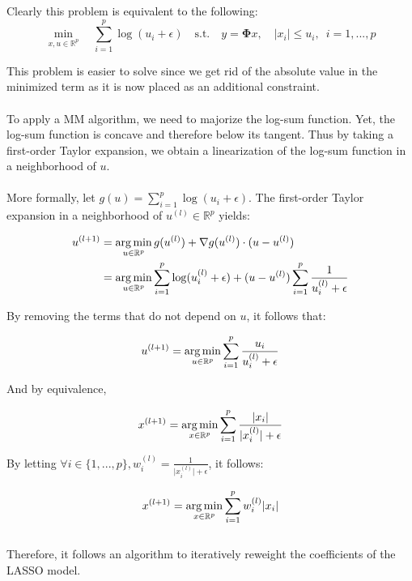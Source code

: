 \documentclass[a4paper,10pt]{article}
\theoremstyle{definition}
\begin{document}
Clearly this problem is equivalent to the following:
\begin{equation*}
    \min_{x,u \in \mathbb{R}^p} \quad  \sum_{i=1}^p \log(u_i + \epsilon) \quad \textrm{s.t.} \quad  y = \mathbf{\Phi} x, \quad \lvert x_i \rvert \leq u_i, \enspace i=1,...,p
\end{equation*}

This problem is easier to solve since we get rid of the absolute value in the minimized term as it is now placed as an additional constraint.
\\
\\
To apply a MM algorithm, we need to majorize the log-sum function. Yet, the log-sum function is concave and therefore below its tangent. Thus by taking a first-order Taylor expansion, we obtain a linearization of
the log-sum function in a neighborhood of $u$.
\\
\\
More formally, let $g(u) = \sum_{i=1}^p \log(u_i + \epsilon)$. The first-order Taylor expansion in a neighborhood of $u^{(l)} \in \mathbb{R}^p$ yields:

\begin{align*}
    u^{(l+1)} &= \operatorname*{arg\,min}_{u \in \mathbb{R}^p} g(u^{(l)}) + \nabla g(u^{(l)})\cdot (u - u^{(l)}) \\
              &= \operatorname*{arg\,min}_{u \in \mathbb{R}^p} \sum_{i=1}^p \log( u_i^{(l)} + \epsilon) + (u - u^{(l)}) \sum_{i=1}^p \frac{1}{ u_i^{(l)}  + \epsilon}
\end{align*}

By removing the terms that do not depend on $u$, it follows that:

\begin{equation*}
    u^{(l+1)} = \operatorname*{arg\,min}_{u \in \mathbb{R}^p} \sum_{i=1}^p \frac{u_i}{ u_i^{(l)} + \epsilon}
\end{equation*}

And by equivalence,

\begin{equation*}
    x^{(l+1)} = \operatorname*{arg\,min}_{x \in \mathbb{R}^p} \sum_{i=1}^p \frac{\lvert x_i \rvert}{\lvert x_i^{(l)} \rvert + \epsilon}
\end{equation*}

By letting $\forall i \in \{1, ..., p\}, w_i^{(l)} = \frac{1}{\lvert x_i^{(l)}\rvert + \epsilon}$, it follows:

\begin{equation*}
    x^{(l+1)} = \operatorname*{arg\,min}_{x \in \mathbb{R}^p} \sum_{i=1}^p w_i^{(l)} \lvert x_i \rvert
\end{equation*}
\\
Therefore, it follows an algorithm to iteratively reweight the coefficients of the LASSO model.
\end{document}
